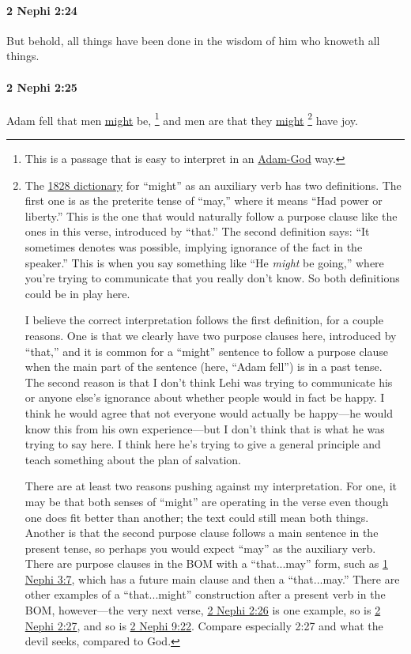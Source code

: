 		\paragraph{2 Nephi 2:24} %
			\label{2NEPHI-2-24}

			But behold, all things have been done
			in the wisdom of him who knoweth all things.

		\paragraph{2 Nephi 2:25} %
			\label{2NEPHI-2-25}

			Adam fell that men \hyperref[MIGHT-1828]{might} be,%
				\footnote{%
					\label{2NEPHI-2-25-be}%
					This is a passage that is easy to interpret in an \hyperref[ADAMGOD]{Adam-God} way.
					}
			and men are that they \hyperref[MIGHT-1828]{might}%
				\footnote{%
					\label{2NEPHI-2-25-might}%
					The \hyperref[MIGHT-1828]{1828 dictionary} for ``might'' as an auxiliary verb has two definitions. The first one is as the preterite tense of ``may,'' where it means ``Had power or liberty.'' This is the one that would naturally follow a purpose clause like the ones in this verse, introduced by ``that.'' The second definition says: ``It sometimes denotes was possible, implying ignorance of the fact in the speaker.'' This is when you say something like ``He \textit{might} be going,'' where you're trying to communicate that you really don't know. So both definitions could be in play here.
					
					I believe the correct interpretation follows the first definition, for a couple reasons. One is that we clearly have two purpose clauses here, introduced by ``that,'' and it is common for a ``might'' sentence to follow a purpose clause when the main part of the sentence (here, ``Adam fell'') is in a past tense. The second reason is that I don't think Lehi was trying to communicate his or anyone else's ignorance about whether people would in fact be happy. I think he would agree that not everyone would actually be happy---he would know this from his own experience---but I don't think that is what he was trying to say here. I think here he's trying to give a general principle and teach something about the plan of salvation.
					
					There are at least two reasons pushing against my interpretation. For one, it may be that both senses of ``might'' are operating in the verse even though one does fit better than another; the text could still mean both things. Another is that the second purpose clause follows a main sentence in the present tense, so perhaps you would expect ``may'' as the auxiliary verb. There are purpose clauses in the BOM with a ``that...may'' form, such as \hyperref[1NEPHI-3-7]{1 Nephi 3:7}, which has a future main clause and then a ``that...may.'' There are other examples of a ``that...might'' construction after a present verb in the BOM, however---the very next verse, \hyperref[2NEPHI-2-26]{2 Nephi 2:26} is one example, so is \hyperref[2NEPHI-2-27]{2 Nephi 2:27}, and so is \hyperref[2NEPHI-9-22]{2 Nephi 9:22}. Compare especially 2:27 and what the devil seeks, compared to God.
					}
			have joy.

